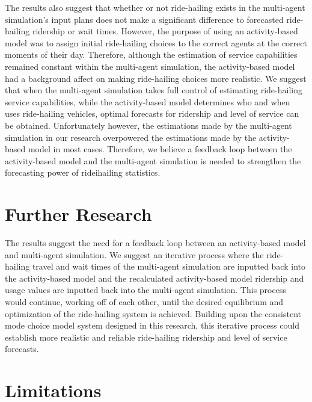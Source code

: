 \documentclass[fancy, masters]{byuthesis}
\begin{document}
The results also suggest that whether or not ride-hailing exists in the multi-agent simulation's input plans does not make a significant difference to forecasted ride-hailing ridership or wait times. However, the purpose of using an activity-based model was to assign initial ride-hailing choices to the correct agents at the correct moments of their day. Therefore, although the estimation of service capabilities remained constant within the multi-agent simulation, the activity-based model had a background affect on making ride-hailing choices more realistic. We suggest that when the multi-agent simulation takes full control of estimating ride-hailing service capabilities, while the activity-based model determines who and when uses ride-hailing vehicles, optimal forecasts for ridership and level of service can be obtained. Unfortunately however, the estimations made by the multi-agent simulation in our research overpowered the estimations made by the activity-based model in most cases. Therefore, we believe a feedback loop between the activity-based model and the multi-agent simulation is needed to strengthen the forecasting power of rideihailing statistics.

\hypertarget{further-research}{%
\section{Further Research}\label{further-research}}

The results suggest the need for a feedback loop between an activity-based model and multi-agent simulation. We suggest an iterative process where the ride-hailing travel and wait times of the multi-agent simulation are inputted back into the activity-based model and the recalculated activity-based model ridership and usage values are inputted back into the multi-agent simulation. This process would continue, working off of each other, until the desired equilibrium and optimization of the ride-hailing system is achieved. Building upon the consistent mode choice model system designed in this research, this iterative process could establish more realistic and reliable ride-hailing ridership and level of service forecasts.

\hypertarget{limitations}{%
\section{Limitations}\label{limitations}}
\end{document}
